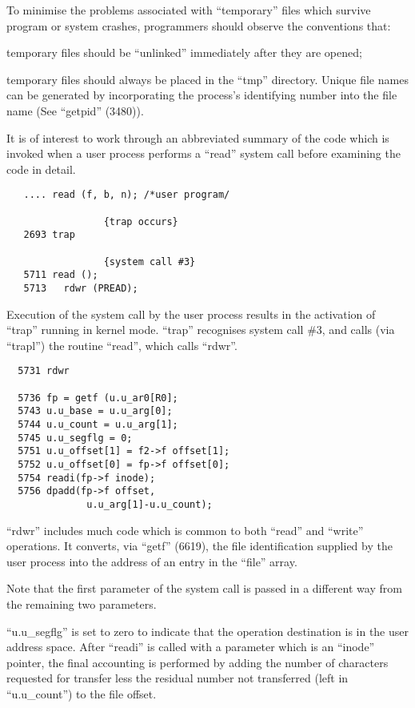 To minimise the problems associated
with ``temporary'' files which survive
program or system crashes, programmers
should observe the conventions that:

\bd
\item[(a)] temporary files should be
 ``unlinked'' immediately after
 they are opened;

\item[(b)] temporary files should always be
 placed in the ``tmp'' directory.
 Unique file names can be generated by incorporating the
 process's identifying number into the file name (See ``getpid''
 (3480)).
\ed


It is of interest to work through an
abbreviated summary of the code which
is invoked when a user process performs
a ``read'' system call before examining
the code in detail.

\begin{verbatim}
   .... read (f, b, n); /*user program/

                 {trap occurs}
   2693 trap

                 {system call #3}
   5711 read ();
   5713   rdwr (PREAD);
\end{verbatim}



Execution of the system call by the
user process results in the activation
of ``trap'' running in kernel mode.
``trap'' recognises system call \#3, and
calls (via ``trapl'') the routine ``read'',
which calls ``rdwr''.

\begin{verbatim}
  5731 rdwr

  5736 fp = getf (u.u_ar0[R0];
  5743 u.u_base = u.u_arg[0];
  5744 u.u_count = u.u_arg[1];
  5745 u.u_segflg = 0;
  5751 u.u_offset[1] = f2->f offset[1];
  5752 u.u_offset[0] = fp->f offset[0];
  5754 readi(fp->f inode);
  5756 dpadd(fp->f offset,
              u.u_arg[1]-u.u_count);
\end{verbatim}

``rdwr'' includes much code which is common to both ``read'' and ``write'' operations. It converts, via ``getf'' (6619),
the file identification supplied by the
user process into the address of an
entry in the ``file'' array.

Note that the first parameter of the
system call is passed in a different
way from the remaining two parameters.


``u.u\_segflg'' is set to zero to indicate
that the operation destination is in
the user address space. After ``readi''
is called with a parameter which is an
``inode'' pointer, the final accounting
is performed by adding the number of
characters requested for transfer less
the residual number not transferred
(left in ``u.u\_count'') to the file
offset.

